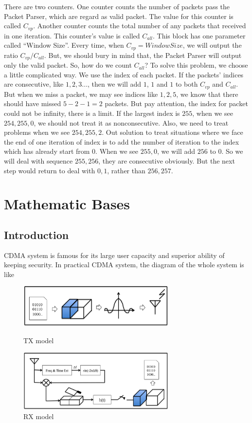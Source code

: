 \documentclass[a4paper]{report}
\begin{document}
There are two counters. One counter counts the number of packets pass the Packet Parser, which are regard as valid packet. The value for this counter is called $C_{vp}$. Another counter counts the total number of any packets that received in one iteration. This counter's value is called $C_{all}$. This block has one parameter called ``Window Size''. Every time, when $C_{vp} = Window Size$, we will output the ratio $C_{vp} / C_{all}$. But, we should bury in mind that, the Packet Parser will output only the valid packet. So, how do we count $C_{all}$? To solve this problem, we choose a little complicated way. We use the index of each packet. If the packets' indices are consecutive, like $1, 2, 3...$, then we will add $1$, $1$ and $1$ to both $C_{vp}$ and $C_{all}$. But when we miss a packet, we may see indices like $1, 2, 5$, we know that there should have missed $5-2-1 = 2$ packets. But pay attention, the index for packet could not be infinity, there is a limit. If the largest index is $255$, when we see $254, 255, 0$, we should not treat it as nonconsecutive. Also, we need to treat problems when we see $254, 255, 2$. Out solution to treat situations where we face the end of one iteration of index is to add the number of iteration to the index which has already start from 0. When we see $255, 0$, we will add $256$ to 0. So we will deal with sequence $255, 256$, they are consecutive obviously. But the next step would return to deal with $0, 1$, rather than $256, 257$. 

\chapter{Mathematic Bases}
\label{ch:Mathematic Bases}
\section{Introduction} %
\label{sec:Introduction}
CDMA system is famous for its large user capacity and superior ability of keeping security. In practical CDMA system, the diagram of the whole system is like 
\begin{figure}[ht]
	\centering
	\includegraphics[width=3.1in]{figure/tx.png}
	\caption{TX model}
	\label{fig:TX diagram}
	\includegraphics[width = 3.1in]{figure/rx.png}
	\caption{RX model}
	\label{fig：RX diagram}
\end{figure}
\end{document}
